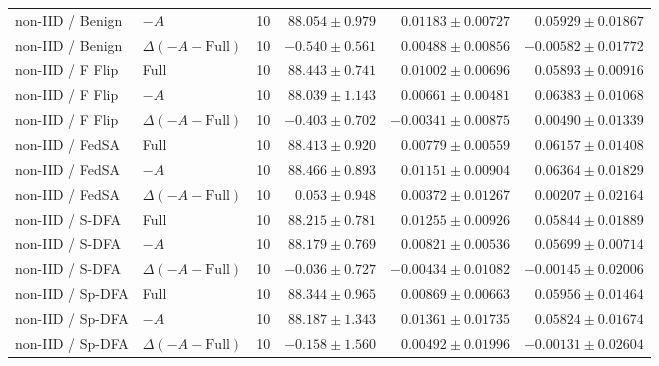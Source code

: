 \begin{table}[t]
\begin{tabular}{llrrrr}
non-IID / Benign & $-A$ & 10 & $88.054 \pm 0.979$ & $0.01183 \pm 0.00727$ & $0.05929 \pm 0.01867$ \\
non-IID / Benign & $\Delta(-A-\mathrm{Full})$ & 10 & $-0.540 \pm 0.561$ & $0.00488 \pm 0.00856$ & $-0.00582 \pm 0.01772$ \\
non-IID / F Flip & Full & 10 & $88.443 \pm 0.741$ & $0.01002 \pm 0.00696$ & $0.05893 \pm 0.00916$ \\
non-IID / F Flip & $-A$ & 10 & $88.039 \pm 1.143$ & $0.00661 \pm 0.00481$ & $0.06383 \pm 0.01068$ \\
non-IID / F Flip & $\Delta(-A-\mathrm{Full})$ & 10 & $-0.403 \pm 0.702$ & $-0.00341 \pm 0.00875$ & $0.00490 \pm 0.01339$ \\
non-IID / FedSA & Full & 10 & $88.413 \pm 0.920$ & $0.00779 \pm 0.00559$ & $0.06157 \pm 0.01408$ \\
non-IID / FedSA & $-A$ & 10 & $88.466 \pm 0.893$ & $0.01151 \pm 0.00904$ & $0.06364 \pm 0.01829$ \\
non-IID / FedSA & $\Delta(-A-\mathrm{Full})$ & 10 & $0.053 \pm 0.948$ & $0.00372 \pm 0.01267$ & $0.00207 \pm 0.02164$ \\
non-IID / S-DFA & Full & 10 & $88.215 \pm 0.781$ & $0.01255 \pm 0.00926$ & $0.05844 \pm 0.01889$ \\
non-IID / S-DFA & $-A$ & 10 & $88.179 \pm 0.769$ & $0.00821 \pm 0.00536$ & $0.05699 \pm 0.00714$ \\
non-IID / S-DFA & $\Delta(-A-\mathrm{Full})$ & 10 & $-0.036 \pm 0.727$ & $-0.00434 \pm 0.01082$ & $-0.00145 \pm 0.02006$ \\
non-IID / Sp-DFA & Full & 10 & $88.344 \pm 0.965$ & $0.00869 \pm 0.00663$ & $0.05956 \pm 0.01464$ \\
non-IID / Sp-DFA & $-A$ & 10 & $88.187 \pm 1.343$ & $0.01361 \pm 0.01735$ & $0.05824 \pm 0.01674$ \\
non-IID / Sp-DFA & $\Delta(-A-\mathrm{Full})$ & 10 & $-0.158 \pm 1.560$ & $0.00492 \pm 0.01996$ & $-0.00131 \pm 0.02604$ \\
\bottomrule
\end{tabular}
\end{table}

